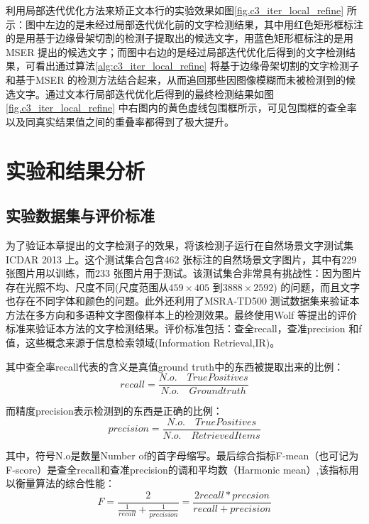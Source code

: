     利用局部迭代优化方法来矫正文本行的实验效果如图\ref{fig.c3_iter_local_refine} 所示：图中左边的是未经过局部迭代优化前的文字检测结果，其中用红色矩形框标注的是用基于边缘骨架切割的检测子提取出的候选文字，用蓝色矩形框标注的是用MSER 提出的候选文字；而图中右边的是经过局部迭代优化后得到的文字检测结果，可看出通过算法\ref{alg:c3_iter_local_refine} 将基于边缘骨架切割的文字检测子和基于MSER 的检测方法结合起来，从而追回那些因图像模糊而未被检测到的候选文字。通过文本行局部迭代优化后得到的最终检测结果如图\ref{fig.c3_iter_local_refine} 中右图内的黄色虚线包围框所示，可见包围框的查全率以及同真实结果值之间的重叠率都得到了极大提升。

    \section{实验和结果分析}

        \subsection{实验数据集与评价标准}

        为了验证本章提出的文字检测子的效果，将该检测子运行在自然场景文字测试集ICDAR 2013 上。这个测试集合包含462 张标注的自然场景文字图片，其中有229张图片用以训练，而233 张图片用于测试。该测试集合非常具有挑战性：因为图片存在光照不均、尺度不同(尺度范围从$459 \times 405$ 到$3888 \times 2592$) 的问题，而且文字也存在不同字体和颜色的问题。此外还利用了MSRA-TD500 测试数据集来验证本方法在多方向和多语种文字图像样本上的检测效果。最终使用Wolf 等\cite{Wolf2006Object}提出的评价标准来验证本方法的文字检测结果。评价标准包括：查全recall，查准precision 和f 值，这些概念来源于信息检索领域(Information Retrieval,IR)。

        其中查全率recall代表的含义是真值ground truth中的东西被提取出来的比例：
        \begin{equation}
        recall=\frac{N.o. \quad True Positives}{N.o. \quad Ground truth}
        \end{equation}

        而精度precision表示检测到的东西是正确的比例：
        \begin{equation}
        precision=\frac{N.o. \quad True Positives}{N.o. \quad Retrieved Items}
        \end{equation}

        其中，符号N.o是数量Number of的首字母缩写。最后综合指标F-mean（也可记为F-score）是查全recall和查准precision的调和平均数（Harmonic mean）,该指标用以衡量算法的综合性能：
        \begin{equation}
        F=\frac{2}{\frac{1}{recall}+\frac{1}{precision}}=\frac{2recall*precsion}{recall+precision}
        \end{equation}
        

